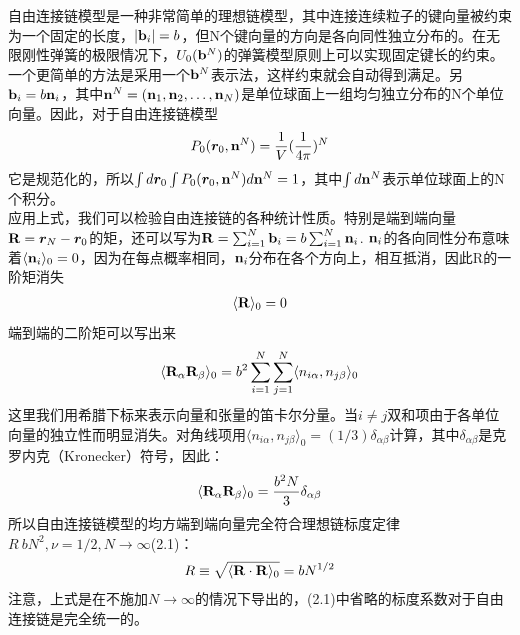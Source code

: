 自由连接链模型是一种非常简单的理想链模型，其中连接连续粒子的键向量被约束为一个固定的长度，$|\mathbf{b}_{i}|=b$，但N个键向量的方向是各向同性独立分布的。在无限刚性弹簧的极限情况下，$U_0(\mathbf{b}^{N})$的弹簧模型原则上可以实现固定键长的约束。一个更简单的方法是采用一个$\mathbf{b}^{N}$表示法，这样约束就会自动得到满足。另$\mathbf{b}_{i}=b\mathbf{n}_{i}$，其中$\mathbf{n}^{N}=(\mathbf{n}_1,\mathbf{n}_2,\ldots,\mathbf{n}_{N})$是单位球面上一组均匀独立分布的N个单位向量。因此，对于自由连接链模型\\
\begin{gather}
P_0(\bm{r}_0,\mathbf{n}^{N})=\frac{1}{V} (\frac{1}{4 \pi})^{N}
\label{2.8}
\end{gather}
它是规范化的，所以$\int d\bm{r}_0\int P_0(\bm{r}_0,\mathbf{n}^{N})d\mathbf{n}^{N}=1$，其中$\int d\mathbf{n}^{N}$表示单位球面上的N个积分。\\
应用上式，我们可以检验自由连接链的各种统计性质。特别是端到端向量$\mathbf{R}=\bm{r}_{N}-\bm{r}_0$的矩，还可以写为$\mathbf{R}=\sum _{i=1}^{N} \mathbf{b}_{i}=b \sum _{i=1}^{N} \mathbf{n}_{i}$.
$\mathbf{n}_{i}$的各向同性分布意味着$\langle \mathbf{n}_{i}\rangle _{0}=0$，因为在每点概率相同，$\mathbf{n}_{i}$分布在各个方向上，相互抵消，因此R的一阶矩消失\\
\begin{gather}
\langle \mathbf{R} \rangle_{0}=0
\label{2.9}
\end{gather}
端到端的二阶矩可以写出来\\
\begin{gather}
\langle \mathbf{R}_{\alpha} \mathbf{R}_{\beta}\rangle_{0}=b^2 \sum _{i=1}^{N} \sum _{j=1}^{N} \langle n_{i \alpha},n_{j \beta} \rangle_{0}
\label{2.10}
\end{gather}
这里我们用希腊下标来表示向量和张量的笛卡尔分量。当$i\neq j$双和项由于各单位向量的独立性而明显消失。对角线项用$\langle n_{i \alpha},n_{j \beta} \rangle_{0}=(1/3)\delta_{\alpha  \beta }$计算，其中$\delta_{\alpha \beta }$是克罗内克（Kronecker）符号，因此：\\
\begin{gather}
\langle \mathbf{R}_{\alpha} \mathbf{R}_{\beta}\rangle_{0}=\frac{b^{2}N}{3}\delta_{\alpha \beta }
\label{2.11}
\end{gather}
所以自由连接链模型的均方端到端向量完全符合理想链标度定律$R~bN^2,\nu=1/2,N \rightarrow \infty $(2.1)：\\
\begin{gather}
R\equiv \sqrt{\langle \mathbf{R} \cdot \mathbf{R}\rangle _{0}}=bN^{1/2}
\label{2.12}
\end{gather}
注意，上式是在不施加$N\rightarrow \infty$的情况下导出的，(2.1)中省略的标度系数对于自由连接链是完全统一的。\\


